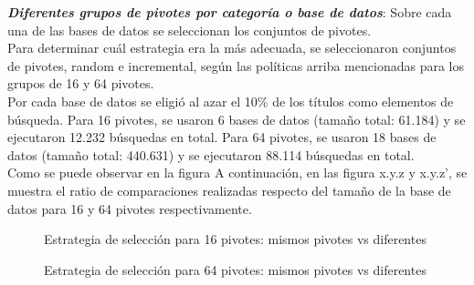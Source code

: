 \textit{\textbf{Diferentes grupos de pivotes por categor\'ia o base de datos}}: Sobre cada una de las bases de datos se seleccionan los conjuntos de pivotes.\\

Para determinar cu\'al estrategia era la m\'as adecuada, se seleccionaron conjuntos de pivotes, random e incremental, seg\'un las pol\'iticas arriba mencionadas para los grupos de 16 y 64 pivotes.\\

Por cada base de datos se eligi\'o al azar el 10\% de los t\'itulos como elementos de b\'usqueda. Para 16 pivotes, se usaron 6 bases de datos (tamaño total: 61.184) y se ejecutaron 12.232  b\'usquedas en total. Para 64 pivotes, se usaron 18 bases de datos (tamaño total: 440.631) y se ejecutaron 88.114 b\'usquedas en total.\\

Como se puede observar en la figura \cite{same-vs-diff-16Pivotes}
A continuaci\'on, en las figura x.y.z y x.y.z’, se muestra el ratio de comparaciones realizadas respecto del tamaño de la base de datos para 16 y 64 pivotes respectivamente.\\



\begin{figure}[H]
\centering
{}
		\caption{\small Estrategia de selecci\'on para 16 pivotes: mismos pivotes vs diferentes}
		\label{fig:same-vs-diff-16Pivotes}
\end{figure}

\begin{figure}[H]
\centering
{}
		\caption{\small Estrategia de selecci\'on para 64 pivotes: mismos pivotes vs diferentes}
		\label{fig:same-vs-diff-64Pivotes}
\end{figure}

